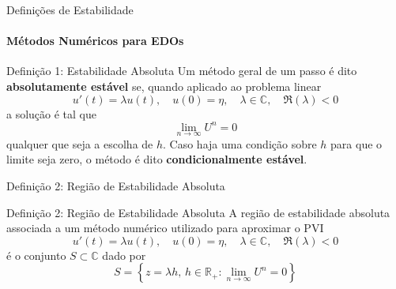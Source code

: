\documentclass[utf8]{beamer}
\theoremstyle{definition}
\begin{document}
\begin{frame}{Definições de Estabilidade}
	\framesubtitle{Métodos Numéricos para EDOs}
	
	\begin{block}{Definição 1: Estabilidade Absoluta}
		Um método geral de um passo é dito \textbf{absolutamente estável} se, quando aplicado ao problema linear
		\[
		u'(t) = \lambda u(t), \quad u(0) = \eta, \quad \lambda \in \mathbb{C}, \quad \Re(\lambda) < 0
		\]
		a solução é tal que
		\[
		\lim_{n \to \infty} U^n = 0
		\]
		qualquer que seja a escolha de $h$. Caso haja uma condição sobre $h$ para que o limite seja zero, o método é dito \textbf{condicionalmente estável}.
	\end{block}
	
	\vspace{0.5cm}
	
	
\end{frame}


\begin{frame}{Definição 2: Região de Estabilidade Absoluta}
		\begin{block}{Definição 2: Região de Estabilidade Absoluta}
		A região de estabilidade absoluta associada a um método numérico utilizado para aproximar o PVI
		\[
		u'(t) = \lambda u(t), \quad u(0) = \eta, \quad \lambda \in \mathbb{C}, \quad \Re(\lambda) < 0
		\]
		é o conjunto $S \subset \mathbb{C}$ dado por
		\[
		S = \left\{ z = \lambda h, \, h \in \mathbb{R}_+ : \lim_{n \to \infty} U^n = 0 \right\}
		\]
	\end{block}
\end{frame}

\end{document}
